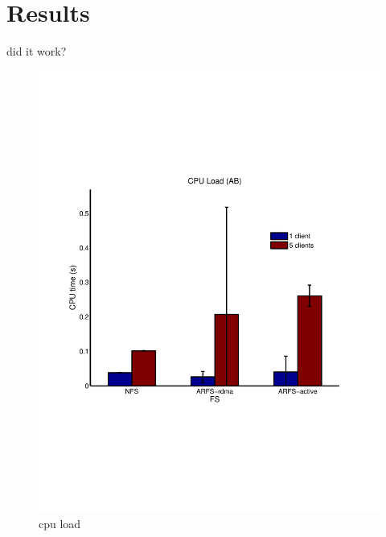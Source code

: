 \documentclass[10pt]{article}
\begin{document}
\section{Results}
did it work?


\begin{figure}
  \centering
\includegraphics[scale=0.5, trim = 0 200 0 200]{../../results/matlab/cpuload.pdf}
  \caption{cpu load}\label{cpuload}
\end{figure}
\end{document}

